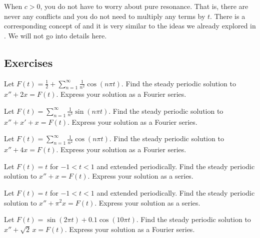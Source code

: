 \documentclass[12pt]{book}
\begin{document}
When $c > 0$, you do not have to worry about pure resonance.  That is,
there are never any conflicts and you do not need to multiply any
terms by $t$.  There is a corresponding concept of
and it is very similar to the ideas we already explored in
.  We will not go into details here.

\subsection{Exercises}

\begin{exercise}
Let $F(t) = \frac{1}{2} + \sum_{n=1}^\infty \frac{1}{n^2} \cos (n \pi t)$.
Find
the steady periodic solution to
$x'' + 2 x = F(t)$.  Express your solution as a Fourier series.
\end{exercise}

\begin{exercise}
Let $F(t) = \sum_{n=1}^\infty \frac{1}{n^3} \sin (n \pi t)$.  Find
the steady periodic solution to
$x'' + x' + x = F(t)$.  Express your solution as a Fourier series.
\end{exercise}

\begin{exercise}
Let $F(t) = \sum_{n=1}^\infty \frac{1}{n^2} \cos (n \pi t)$.  Find
the steady periodic solution to
$x'' + 4 x = F(t)$.  Express your solution as a Fourier series.
\end{exercise}

\begin{exercise}
Let $F(t) = t$ for $-1 < t < 1$ and extended periodically.
Find the steady periodic solution to
$x'' + x = F(t)$.  Express your solution as a series.
\end{exercise}

\begin{exercise}
Let $F(t) = t$ for $-1 < t < 1$ and extended periodically.
Find the steady periodic solution to
$x'' + \pi^2 x = F(t)$.  Express your solution as a series.
\end{exercise}

\setcounter{exercise}{100}

\begin{exercise}
Let $F(t) = \sin(2\pi t) + 0.1 \cos(10 \pi t)$.
Find the steady periodic solution to $x'' + \sqrt{2}\, x = F(t)$.
Express your solution as a Fourier series.
\end{exercise}
\end{document}
